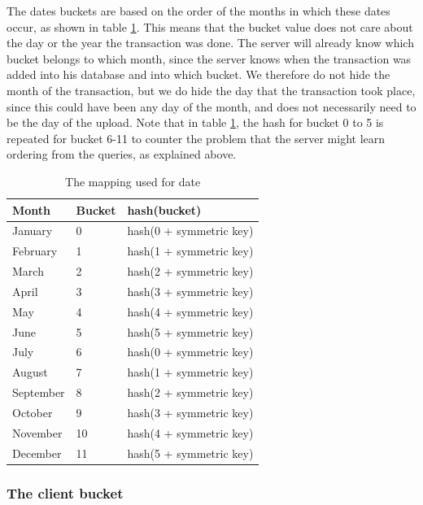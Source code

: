 \documentclass[a4paper]{article}
\begin{document}
        The dates buckets are based on the order of the months in which these dates occur, as shown in table \ref{tab:datebucket}. This means that the bucket value does not care about the day or the year the transaction was done. The server will already know which bucket belongs to which month, since the server knows when the transaction was added into his database and into which bucket. We therefore do not hide the month of the transaction, but we do hide the day that the transaction took place, since this could have been any day of the month, and does not necessarily need to be the day of the upload. Note that in table \ref{tab:datebucket}, the hash for bucket 0 to 5 is repeated for bucket 6-11 to counter the problem that the server might learn ordering from the queries, as explained above. 
        
        \begin{table}[b!]
        \begin{tabular}{| l | l | l |} \hline
            \textbf{Month} & \textbf{Bucket} & \textbf{hash(bucket)} \\ \hline
            January & 0 & hash(0 + symmetric key) \\ \hline
            February & 1 & hash(1 + symmetric key) \\ \hline
            March & 2 & hash(2 + symmetric key) \\ \hline
            April & 3 & hash(3 + symmetric key) \\ \hline
            May & 4 & hash(4 + symmetric key) \\ \hline
            June & 5 & hash(5 + symmetric key) \\ \hline
            July & 6 & hash(0 + symmetric key) \\ \hline
            August & 7 & hash(1 + symmetric key) \\ \hline
            September & 8 & hash(2 + symmetric key) \\ \hline
            October & 9 & hash(3 + symmetric key) \\ \hline
            November & 10 & hash(4 + symmetric key) \\ \hline
            December & 11 & hash(5 + symmetric key) \\ \hline
        \end{tabular}
        \caption{The mapping used for date}\label{tab:datebucket}
        \end{table}
      
      \subsubsection{The client bucket}\label{sec:bucketclient}
           
\end{document}
